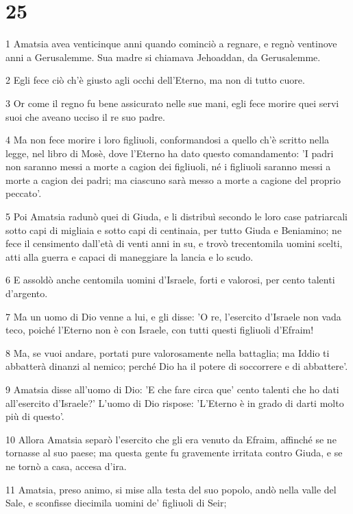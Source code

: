 \chapter{25}

\par 1 Amatsia avea venticinque anni quando cominciò a regnare, e regnò ventinove anni a Gerusalemme. Sua madre si chiamava Jehoaddan, da Gerusalemme.
\par 2 Egli fece ciò ch'è giusto agli occhi dell'Eterno, ma non di tutto cuore.
\par 3 Or come il regno fu bene assicurato nelle sue mani, egli fece morire quei servi suoi che aveano ucciso il re suo padre.
\par 4 Ma non fece morire i loro figliuoli, conformandosi a quello ch'è scritto nella legge, nel libro di Mosè, dove l'Eterno ha dato questo comandamento: 'I padri non saranno messi a morte a cagion dei figliuoli, né i figliuoli saranno messi a morte a cagion dei padri; ma ciascuno sarà messo a morte a cagione del proprio peccato'.
\par 5 Poi Amatsia radunò quei di Giuda, e li distribuì secondo le loro case patriarcali sotto capi di migliaia e sotto capi di centinaia, per tutto Giuda e Beniamino; ne fece il censimento dall'età di venti anni in su, e trovò trecentomila uomini scelti, atti alla guerra e capaci di maneggiare la lancia e lo scudo.
\par 6 E assoldò anche centomila uomini d'Israele, forti e valorosi, per cento talenti d'argento.
\par 7 Ma un uomo di Dio venne a lui, e gli disse: 'O re, l'esercito d'Israele non vada teco, poiché l'Eterno non è con Israele, con tutti questi figliuoli d'Efraim!
\par 8 Ma, se vuoi andare, portati pure valorosamente nella battaglia; ma Iddio ti abbatterà dinanzi al nemico; perché Dio ha il potere di soccorrere e di abbattere'.
\par 9 Amatsia disse all'uomo di Dio: 'E che fare circa que' cento talenti che ho dati all'esercito d'Israele?' L'uomo di Dio rispose: 'L'Eterno è in grado di darti molto più di questo'.
\par 10 Allora Amatsia separò l'esercito che gli era venuto da Efraim, affinché se ne tornasse al suo paese; ma questa gente fu gravemente irritata contro Giuda, e se ne tornò a casa, accesa d'ira.
\par 11 Amatsia, preso animo, si mise alla testa del suo popolo, andò nella valle del Sale, e sconfisse diecimila uomini de' figliuoli di Seir;
